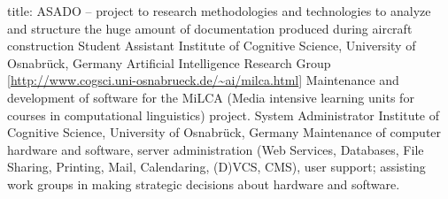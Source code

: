\documentclass[11pt,a4paper]{moderncv}
\begin{document}
        {\small title: ASADO -- project to research methodologies and
        technologies to analyze and structure the huge amount of documentation
        produced during aircraft construction}
        {}{}
        {Student Assistant}
        {Institute of Cognitive Science, University of Osnabr\"{u}ck, Germany}
        {\small Artificial Intelligence Research Group}
        {[\url{http://www.cogsci.uni-osnabrueck.de/~ai/milca.html}]}
        {Maintenance and development of software for the MiLCA (Media intensive
        learning units for courses in computational linguistics) project.}
        {System Administrator}
        {Institute of Cognitive Science, University of Osnabr\"{u}ck, Germany}
        {}
        {}
        {Maintenance of computer hardware and software, server administration
        (Web Services, Databases, File Sharing, Printing, Mail, Calendaring,
        (D)VCS, CMS), user support; assisting work groups in making strategic
        decisions about hardware and software.}
\closesection{}


\end{document}
